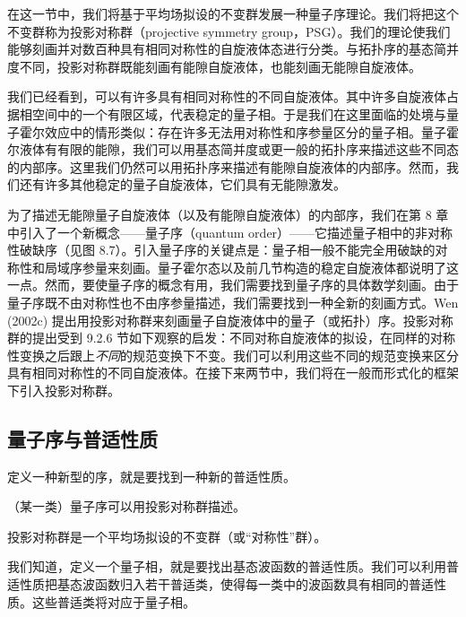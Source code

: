 在这一节中，我们将基于平均场拟设的不变群发展一种量子序理论。我们将把这个不变群称为投影对称群（projective symmetry group，PSG）。我们的理论使我们能够刻画并对数百种具有相同对称性的自旋液体态进行分类。与拓扑序的基态简并度不同，投影对称群既能刻画有能隙自旋液体，也能刻画无能隙自旋液体。

我们已经看到，可以有许多具有相同对称性的不同自旋液体。其中许多自旋液体占据相空间中的一个有限区域，代表稳定的量子相。于是我们在这里面临的处境与量子霍尔效应中的情形类似：存在许多无法用对称性和序参量区分的量子相。量子霍尔液体有有限的能隙，我们可以用基态简并度或更一般的拓扑序来描述这些不同态的内部序。这里我们仍然可以用拓扑序来描述有能隙自旋液体的内部序。然而，我们还有许多其他稳定的量子自旋液体，它们具有无能隙激发。

为了描述无能隙量子自旋液体（以及有能隙自旋液体）的内部序，我们在第 8 章中引入了一个新概念——量子序（quantum order）——它描述量子相中的非对称性破缺序（见图 8.7）。引入量子序的关键点是：量子相一般不能完全用破缺的对称性和局域序参量来刻画。量子霍尔态以及前几节构造的稳定自旋液体都说明了这一点。然而，要使量子序的概念有用，我们需要找到量子序的具体数学刻画。由于量子序既不由对称性也不由序参量描述，我们需要找到一种全新的刻画方式。Wen (2002c) 提出用投影对称群来刻画量子自旋液体中的量子（或拓扑）序。投影对称群的提出受到 9.2.6 节如下观察的启发：不同对称自旋液体的拟设，在同样的对称性变换之后跟上\emph{不同}的规范变换下不变。我们可以利用这些不同的规范变换来区分具有相同对称性的不同自旋液体。在接下来两节中，我们将在一般而形式化的框架下引入投影对称群。

\subsection{量子序与普适性质}

\begin{keypoints}
\item 定义一种新型的序，就是要找到一种新的普适性质。
\item （某一类）量子序可以用投影对称群描述。
\item 投影对称群是一个平均场拟设的不变群（或“对称性”群）。
\end{keypoints}

我们知道，定义一个量子相，就是要找出基态波函数的普适性质。我们可以利用普适性质把基态波函数归入若干普适类，使得每一类中的波函数具有相同的普适性质。这些普适类将对应于量子相。

